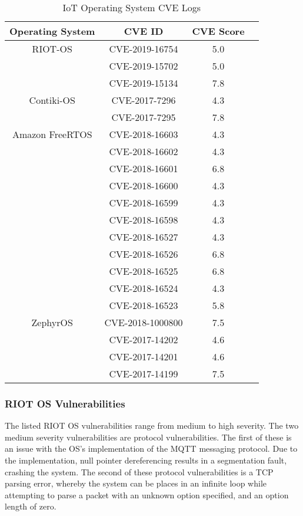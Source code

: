 \begin{table}[H]
	\centering
	\caption{IoT Operating System CVE Logs}
	\label{tab:iotCve}
	\begin{tabular}{|c|c|c|c|}
	\hline
	Operating System & CVE ID & CVE Score \\
	\hline\hline
	RIOT-OS & CVE-2019-16754 & 5.0 \\
		& CVE-2019-15702 & 5.0 \\
		& CVE-2019-15134 & 7.8 \\
	\hline
	Contiki-OS & CVE-2017-7296 & 4.3 \\
		   & CVE-2017-7295 & 7.8 \\
	\hline
	Amazon FreeRTOS & CVE-2018-16603 & 4.3 \\
			& CVE-2018-16602 & 4.3 \\
			& CVE-2018-16601 & 6.8 \\
			& CVE-2018-16600 & 4.3 \\
			& CVE-2018-16599 & 4.3 \\
			& CVE-2018-16598 & 4.3 \\
			& CVE-2018-16527 & 4.3 \\
			& CVE-2018-16526 & 6.8 \\
			& CVE-2018-16525 & 6.8 \\
			& CVE-2018-16524 & 4.3 \\
			& CVE-2018-16523 & 5.8 \\
	\hline
	ZephyrOS & CVE-2018-1000800 & 7.5 \\
		 & CVE-2017-14202   & 4.6 \\
		 & CVE-2017-14201   & 4.6 \\
		 & CVE-2017-14199   & 7.5 \\
	\hline\hline
	\end{tabular}
\end{table}

\subsubsection{\textbf{RIOT OS Vulnerabilities}}

The listed RIOT OS vulnerabilities range from medium to high severity. The two
medium severity vulnerabilities are protocol vulnerabilities. The first of these
is an issue with the OS's implementation of the MQTT messaging
protocol\cite{riotCve1}. Due to
the implementation, null pointer dereferencing results in a segmentation fault,
crashing the system\cite{riotMqtt}. The second of these protocol vulnerabilities
is a TCP parsing error\cite{riotCve2}, whereby the system can be places in an infinite loop while
attempting to parse a packet with an  unknown option specified, and an option
length of zero\cite{riotTcp}.

